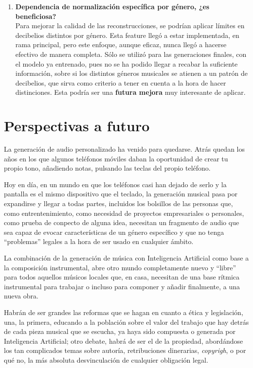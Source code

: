 \begin{enumerate}
    \item \textbf{Dependencia de normalización específica por género, ¿es beneficiosa?} \\
    Para mejorar la calidad de las reconstrucciones, se podrían aplicar límites en decibelios distintos por género. Esta feature llegó a estar implementada, en rama principal, pero este enfoque, aunque eficaz, nunca llegó a hacerse efectivo de manera completa. Sólo se utilizó para las generaciones finales, con el modelo ya entrenado, pues no se ha podido llegar a recabar la suficiente información, sobre si los distintos géneros musicales se atienen a un patrón de decibelios, que sirva como criterio a tener en cuenta a la hora de hacer distinciones. Esta podría ser una \textbf{futura mejora} muy interesante de aplicar.

\end{enumerate}

\section{Perspectivas a futuro}

La generación de audio personalizado ha venido para quedarse. Atrás quedan los años en los que algunos teléfonos móviles daban la oportunidad de crear tu propio tono, añadiendo notas, pulsando las teclas del propio teléfono.

Hoy en día, en un mundo en que los teléfonos casi han dejado de serlo y la pantalla es el mismo dispositivo que el teclado, la generación musical pasa por expandirse y llegar a todas partes, incluidos los bolsillos de las personas que, como entrentenimiento, como necesidad de proyectos empresariales o personales, como prueba de conpecto de alguna idea, necesitan un fragmento de audio que sea capaz de evocar características de un género específico y que no tenga ``problemas'' legales a la hora de ser usado en cualquier ámbito.

La combinación de la generación de música con Inteligencia Artificial como base a la composición instrumental, abre otro mundo completamente nuevo y ``libre'' para todos aquellos músicos locales que, en casa, necesitan de una base rítmica instrumental para trabajar o incluso para componer y añadir finalmente, a una nueva obra.

Habrán de ser grandes las reformas que se hagan en cuanto a ética y legislación, una, la primera, educando a la población sobre el valor del trabajo que hay detrás de cada pieza musical que se escucha, ya haya sido compuesta o generada por Inteligencia Artificial; otro debate, habrá de ser el de la propiedad, abordándose los tan complicados temas sobre autoría, retribuciones dinerarias, \emph{copyrigh}, o por qué no, la más absoluta desvinculación de cualquier obligación legal.